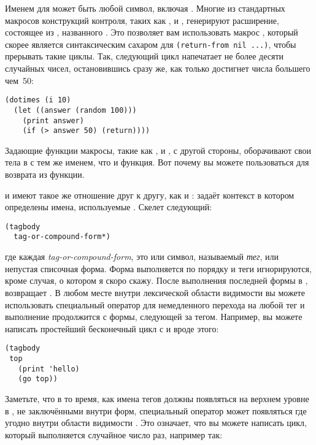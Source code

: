 Именем для  может быть любой символ, включая . Многие из стандартных
макросов конструкций контроля, таких как ,  и ,
генерируют расширение, состоящее из , названного . Это позволяет вам
использовать макрос , который скорее является синтаксическим сахаром для
\lstinline!(return-from nil ...)!, чтобы прерывать такие циклы. Так, следующий цикл
напечатает не более десяти случайных чисел, остановившись сразу же, как только достигнет
числа большего чем~50:

\begin{lstlisting}
(dotimes (i 10)
  (let ((answer (random 100)))
    (print answer)
    (if (> answer 50) (return))))
\end{lstlisting}

Задающие функции макросы, такие как ,  и , с другой
стороны, оборачивают свои тела в  с тем же именем, что и функция. Вот почему
вы можете пользоваться  для возврата из функции.

 и  имеют такое же отношение друг к другу, как  и
:  задаёт контекст в котором определены имена,
используемые . Скелет  следующий:

\begin{lstlisting}
(tagbody
  tag-or-compound-form*)
\end{lstlisting}

где каждая \textit{tag-or-compound-form}, это или символ, называемый \textit{тег}, или
непустая списочная форма. Форма выполняется по порядку и теги игнорируются, кроме случая,
о котором я скоро скажу. После выполнения последней формы в , 
возвращает . В любом месте внутри лексической области видимости 
вы можете использовать специальный оператор  для немедленного перехода на любой
тег и выполнение продолжится с формы, следующей за тегом. Например, вы можете написать
простейший бесконечный цикл с  и  вроде этого:

\begin{lstlisting}
(tagbody
 top
   (print 'hello)
   (go top))
\end{lstlisting}

Заметьте, что в то время, как имена тегов должны появляться на верхнем уровне в
, не заключёнными внутри форм, специальный оператор  может
появляться где угодно внутри области видимости . Это означает, что вы можете
написать цикл, который выполняется случайное число раз, например так:

